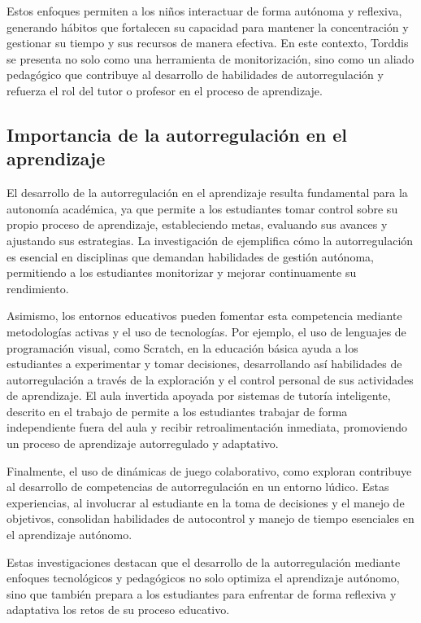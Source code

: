 \documentclass[a4paper,fleqn]{cas-sc}
\begin{document}
		Estos enfoques permiten a los niños interactuar de forma autónoma y reflexiva, generando hábitos que fortalecen su capacidad para mantener la concentración y gestionar su tiempo y sus recursos de manera efectiva. En este contexto, Torddis se presenta no solo como una herramienta de monitorización, sino como un aliado pedagógico que contribuye al desarrollo de habilidades de autorregulación y refuerza el rol del tutor o profesor en el proceso de aprendizaje.
		
		\subsection{Importancia de la autorregulación en el aprendizaje}
			El desarrollo de la autorregulación en el aprendizaje resulta fundamental para la autonomía académica, ya que permite a los estudiantes tomar control sobre su propio proceso de aprendizaje, estableciendo metas, evaluando sus avances y ajustando sus estrategias. La investigación de \cite{Taber2024Developing} ejemplifica cómo la autorregulación es esencial en disciplinas que demandan habilidades de gestión autónoma, permitiendo a los estudiantes monitorizar y mejorar continuamente su rendimiento.
			
			Asimismo, los entornos educativos pueden fomentar esta competencia mediante metodologías activas y el uso de tecnologías. Por ejemplo, el uso de lenguajes de programación visual, como Scratch, en la educación básica ayuda a los estudiantes a experimentar y tomar decisiones, desarrollando así habilidades de autorregulación a través de la exploración y el control personal de sus actividades de aprendizaje. El aula invertida apoyada por sistemas de tutoría inteligente, descrito en el trabajo de \cite{Mohamed2018Implementing} permite a los estudiantes trabajar de forma independiente fuera del aula y recibir retroalimentación inmediata, promoviendo un proceso de aprendizaje autorregulado y adaptativo.
			
			Finalmente, el uso de dinámicas de juego colaborativo, como  exploran \cite{Echeverria2011AFramework} contribuye al desarrollo de competencias de autorregulación en un entorno lúdico. Estas experiencias, al involucrar al estudiante en la toma de decisiones y el manejo de objetivos, consolidan habilidades de autocontrol y manejo de tiempo esenciales en el aprendizaje autónomo.
			
			Estas investigaciones destacan que el desarrollo de la autorregulación mediante enfoques tecnológicos y pedagógicos no solo optimiza el aprendizaje autónomo, sino que también prepara a los estudiantes para enfrentar de forma reflexiva y adaptativa los retos de su proceso educativo.
			
\end{document}
